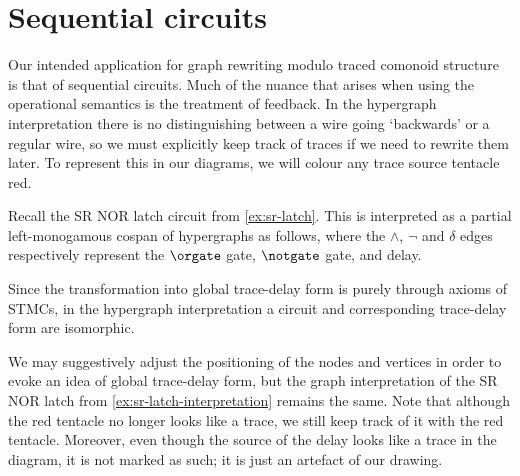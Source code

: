 \section{Sequential circuits}

Our intended application for graph rewriting modulo traced
comonoid structure is that of sequential circuits.
Much of the nuance that arises when using the operational semantics is the
treatment of feedback.
In the hypergraph interpretation there is no distinguishing between a wire going
`backwards' or a regular wire, so we must explicitly keep track of traces if we
need to rewrite them later.
To represent this in our diagrams, we will colour any trace source tentacle red.

\begin{example}\label{ex:sr-latch-interpretation}
    Recall the SR NOR latch circuit from \cref{ex:sr-latch}.
    This is interpreted as a partial left-monogamous cospan of hypergraphs as
    follows, where the \(\wedge\), \(\neg\) and \(\delta\) edges respectively
    represent the \(\orgate\) gate, \(\notgate\) gate, and delay.
    \begin{center}
    \end{center}
\end{example}

Since the transformation into global trace-delay form is purely through axioms
of STMCs, in the hypergraph interpretation a circuit and corresponding
trace-delay form are isomorphic.

\begin{example}
    We may suggestively adjust the positioning of the nodes and vertices in
    order to evoke an idea of global trace-delay form, but the graph
    interpretation of the SR NOR latch from \cref{ex:sr-latch-interpretation}
    remains the same.
    Note that although the red tentacle no longer looks like a trace, we still
    keep track of it with the red tentacle.
    Moreover, even though the source of the delay looks like a trace in the
    diagram, it is not marked as such; it is just an artefact of our drawing.
    \begin{center}
    \end{center}
\end{example}

